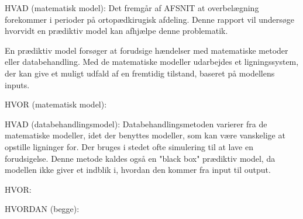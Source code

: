 %
HVAD (matematisk model):
Det fremgår af AFSNIT at overbelægning forekommer i perioder på ortopædkirugisk afdeling. Denne rapport vil undersøge hvorvidt en prædiktiv model kan afhjælpe denne problematik. 

En prædiktiv model forsøger at forudsige hændelser med matematiske metoder eller databehandling. Med de matematiske modeller udarbejdes et ligningssystem, der kan give et muligt udfald af en fremtidig tilstand, baseret på modellens inputs.

HVOR (matematisk model):


HVAD (databehandlingsmodel):
Databehandlingsmetoden varierer fra de matematiske modeller, idet der benyttes modeller, som kan være vanskelige at opstille ligninger for. Der bruges i stedet ofte simulering til at lave en forudsigelse. Denne metode kaldes også en "black box" prædiktiv model, da modellen ikke giver et indblik i, hvordan den kommer fra input til output.

HVOR: 


HVORDAN (begge):

